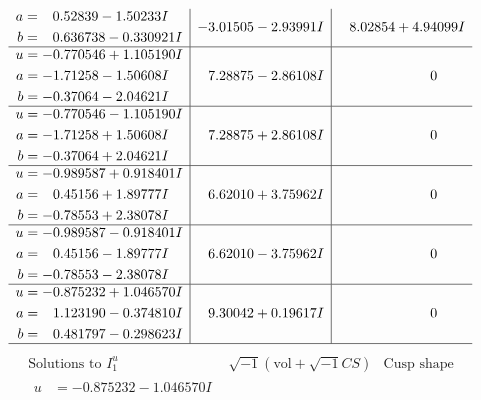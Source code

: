 \documentclass[1p]{elsarticle_modified}
\theoremstyle{definition}
\newcommand{\I}{\sqrt{-1}}
\begin{document}
$$\begin{array}{c|c|c}
\begin{aligned}
a &= \phantom{-}0.52839 - 1.50233 I \\
b &= \phantom{-}0.636738 - 0.330921 I\end{aligned}
 & -3.01505 - 2.93991 I & \phantom{-}8.02854 + 4.94099 I \\ \hline\begin{aligned}
u &= -0.770546 + 1.105190 I \\
a &= -1.71258 - 1.50608 I \\
b &= -0.37064 - 2.04621 I\end{aligned}
 & \phantom{-}7.28875 - 2.86108 I & \phantom{-0.000000 } 0 \\ \hline\begin{aligned}
u &= -0.770546 - 1.105190 I \\
a &= -1.71258 + 1.50608 I \\
b &= -0.37064 + 2.04621 I\end{aligned}
 & \phantom{-}7.28875 + 2.86108 I & \phantom{-0.000000 } 0 \\ \hline\begin{aligned}
u &= -0.989587 + 0.918401 I \\
a &= \phantom{-}0.45156 + 1.89777 I \\
b &= -0.78553 + 2.38078 I\end{aligned}
 & \phantom{-}6.62010 + 3.75962 I & \phantom{-0.000000 } 0 \\ \hline\begin{aligned}
u &= -0.989587 - 0.918401 I \\
a &= \phantom{-}0.45156 - 1.89777 I \\
b &= -0.78553 - 2.38078 I\end{aligned}
 & \phantom{-}6.62010 - 3.75962 I & \phantom{-0.000000 } 0 \\ \hline\begin{aligned}
u &= -0.875232 + 1.046570 I \\
a &= \phantom{-}1.123190 - 0.374810 I \\
b &= \phantom{-}0.481797 - 0.298623 I\end{aligned}
 & \phantom{-}9.30042 + 0.19617 I & \phantom{-0.000000 } 0\\
 \hline 
 \end{array}$$\newpage$$\begin{array}{c|c|c}  
\text{Solutions to }I^u_{1}& \I (\text{vol} + \sqrt{-1}CS) & \text{Cusp shape}\\
 \hline 
\begin{aligned}
u &= -0.875232 - 1.046570 I \\

\end{aligned}
\end{array}$$
\end{document}
